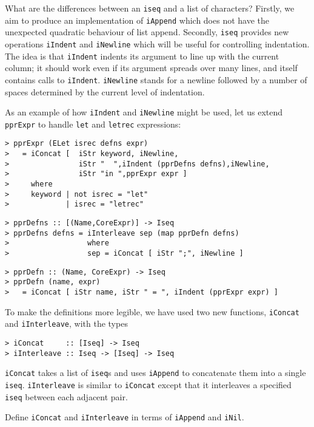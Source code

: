 What are the differences between an \mbox{\tt iseq} and a list of characters?
Firstly, we
aim to produce an implementation of \mbox{\tt iAppend} which does not have the
unexpected quadratic behaviour of list append.
Secondly, \mbox{\tt iseq} provides new operations \mbox{\tt iIndent} and \mbox{\tt iNewline}
which will be useful
for controlling indentation.
The idea is that \mbox{\tt iIndent} indents
its argument to line up with the current column;
it should work even if its
argument spreads over many lines, and itself
contains calls to \mbox{\tt iIndent}.
\mbox{\tt iNewline} stands for a newline
followed by a number of spaces determined by
the current level of indentation.

As an example of how \mbox{\tt iIndent} and \mbox{\tt iNewline}
might be used, let us extend \mbox{\tt pprExpr} to handle
\mbox{\tt let} and \mbox{\tt letrec} expressions:
\begin{verbatim}
> pprExpr (ELet isrec defns expr)
>   = iConcat [  iStr keyword, iNewline,
>                iStr "  ",iIndent (pprDefns defns),iNewline,
>                iStr "in ",pprExpr expr ]
>     where
>     keyword | not isrec = "let"
>             | isrec = "letrec"
\end{verbatim}
%
\begin{verbatim}
> pprDefns :: [(Name,CoreExpr)] -> Iseq
> pprDefns defns = iInterleave sep (map pprDefn defns)
>                  where
>                  sep = iConcat [ iStr ";", iNewline ]
\end{verbatim}
%
%
\begin{verbatim}
> pprDefn :: (Name, CoreExpr) -> Iseq
> pprDefn (name, expr)
>   = iConcat [ iStr name, iStr " = ", iIndent (pprExpr expr) ]
\end{verbatim}
%
%
To make the definitions more legible, we have used
two new functions, \mbox{\tt iConcat} and \mbox{\tt iInterleave}, with the types
\begin{verbatim}
> iConcat     :: [Iseq] -> Iseq
> iInterleave :: Iseq -> [Iseq] -> Iseq
\end{verbatim}
%
%
\mbox{\tt iConcat} takes a list of \mbox{\tt iseq}s and
uses \mbox{\tt iAppend} to concatenate them into a single \mbox{\tt iseq}.  \mbox{\tt iInterleave} is
similar to \mbox{\tt iConcat} except that it interleaves a specified \mbox{\tt iseq} between
each adjacent pair.
\begin{exercise}
\label{ex:iConcat}
Define \mbox{\tt iConcat} and \mbox{\tt iInterleave} in terms of \mbox{\tt iAppend} and \mbox{\tt iNil}.
\end{exercise}

